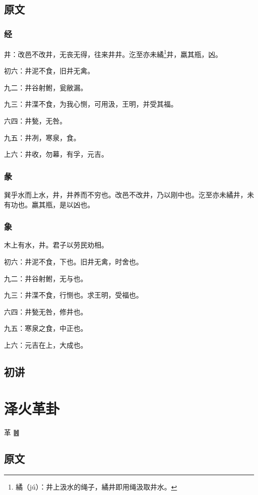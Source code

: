 \documentclass[12pt,oneside]{book}
\begin{document}
\section{原文}

\subsection{经}
井：改邑不改井，无丧无得，往来井井。汔至亦未繘\footnote{繘（jú）：井上汲水的绳子，繘井即用绳汲取井水。}井，羸其瓶，凶。

初六：井泥不食，旧井无禽。

九二：井谷射鲋，瓮敝漏。

九三：井渫不食，为我心恻，可用汲，王明，并受其福。

六四：井甃，无咎。

九五：井冽，寒泉，食。

上六：井收，勿幕，有孚，元吉。

\subsection{彖}
巽乎水而上水，井，井养而不穷也。改邑不改井，乃以刚中也。汔至亦未繘井，未有功也。羸其瓶，是以凶也。

\subsection{象}
木上有水，井。君子以劳民劝相。

初六：井泥不食，下也。旧井无禽，时舍也。

九二：井谷射鲋，无与也。

九三：井渫不食，行恻也。求王明，受福也。

六四：井甃无咎，修井也。

九五：寒泉之食，中正也。

上六：元吉在上，大成也。

\section{初讲}



\chapter{泽火革卦}
革 {\Large ䷰}

\section{原文}
\end{document}
